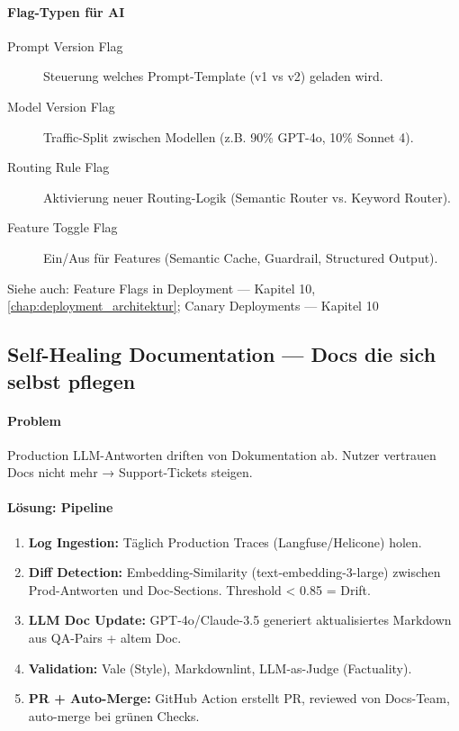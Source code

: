 \paragraph{Flag-Typen für AI}
\begin{description}
    \item[Prompt Version Flag] Steuerung welches Prompt-Template (v1 vs v2) geladen wird.
    \item[Model Version Flag] Traffic-Split zwischen Modellen (z.B. 90\% GPT-4o, 10\% Sonnet 4).
    \item[Routing Rule Flag] Aktivierung neuer Routing-Logik (Semantic Router vs. Keyword Router).
    \item[Feature Toggle Flag] Ein/Aus für Features (Semantic Cache, Guardrail, Structured Output).
\end{description}

Siehe auch: Feature Flags in Deployment — Kapitel 10, \ref{chap:deployment_architektur}; Canary Deployments — Kapitel 10

\subsection{Self-Healing Documentation — Docs die sich selbst pflegen}

\paragraph{Problem} Production LLM-Antworten driften von Dokumentation ab. Nutzer vertrauen Docs nicht mehr → Support-Tickets steigen.

\paragraph{Lösung: Pipeline}
\begin{enumerate}
    \item \textbf{Log Ingestion:} Täglich Production Traces (Langfuse/Helicone) holen.
    \item \textbf{Diff Detection:} Embedding-Similarity (text-embedding-3-large) zwischen Prod-Antworten und Doc-Sections. Threshold < 0.85 = Drift.
    \item \textbf{LLM Doc Update:} GPT-4o/Claude-3.5 generiert aktualisiertes Markdown aus QA-Pairs + altem Doc.
    \item \textbf{Validation:} Vale (Style), Markdownlint, LLM-as-Judge (Factuality).
    \item \textbf{PR + Auto-Merge:} GitHub Action erstellt PR, reviewed von Docs-Team, auto-merge bei grünen Checks.
\end{enumerate}

